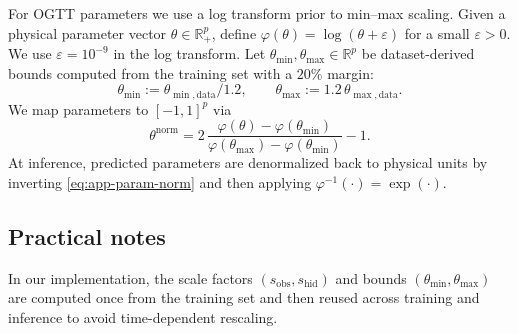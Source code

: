 For OGTT parameters we use a log transform prior to min--max scaling.
Given a physical parameter vector $\theta\in\mathbb{R}_+^p$, define $\varphi(\theta)=\log(\theta+\varepsilon)$ for a small $\varepsilon>0$.
We use $\varepsilon=10^{-9}$ in the log transform.
Let $\theta_{\min},\theta_{\max}\in\mathbb{R}^p$ be dataset-derived bounds computed from the training set with a $20\%$ margin:
\begin{equation}
\label{eq:app-param-bounds}
\theta_{\min} := \theta_{\min,\mathrm{data}}/1.2,\qquad
\theta_{\max} := 1.2\,\theta_{\max,\mathrm{data}}.
\end{equation}
We map parameters to $[-1,1]^p$ via
\begin{equation}
\label{eq:app-param-norm}
\theta^{\mathrm{norm}}
= 2\,\frac{\varphi(\theta)-\varphi(\theta_{\min})}{\varphi(\theta_{\max})-\varphi(\theta_{\min})}-1.
\end{equation}
At inference, predicted parameters are denormalized back to physical units by inverting \eqref{eq:app-param-norm} and then applying
$\varphi^{-1}(\cdot)=\exp(\cdot)$.

\subsection{Practical notes}
\label{app:practical-notes}

In our implementation, the scale factors $(s_{\mathrm{obs}},s_{\mathrm{hid}})$ and bounds $(\theta_{\min},\theta_{\max})$ are computed once from the training set and
then reused across training and inference to avoid time-dependent rescaling.